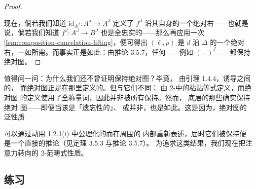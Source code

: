 \begin{proof}
\begin{center}
\end{center}
现在，倘若我们知道 $\mathrm{id}_{A^{J}}\colon A^{J}\to A^{J}$ 定义了
$f^{J}$ 沿其自身的一个绝对右\trLifting——也就是说，倘若我们知道
$f^{J}\colon A^{J}\to B^{J}$ 也是全忠实的——那么再应用一次%
\cref{lem:composition-cancelation-lifting}，便可得出 $(\ell,\rho)$ 是 $d$
沿 $\Delta$ 的一个绝对右\trLifting，一如所需。而事实正是如此：由推论
3.5.7，任何\trCosmologicalFunctor{}——例如 $(-)^{J}$——都保持绝对\trLifting{}图。
\end{proof}

值得问一问：为什么我们还不曾证明\trCosmologicalFunctor{}保持绝对\trLifting{}图？毕竟，
由引理 1.4.4，\trCosmologicalFunctor{}诱导\trHomotopyTwoCategory{}之间的\trTwoFunctor，
而绝对\trLifting{}图正是在那里定义的。但\trAdjunction{}与它们不同：
\trAdjunction{}由 2-\trCategory{}中的粘贴等式定义，而绝对\trLifting{}图
的定义使用了全称量词，因此并非被所有\trTwoFunctor{}保持。然而，
\trCosmologicalFunctor{}底层的那些\trTwoFunctor{}确实保持绝对%
\trLifting{}图——即便当该\trCosmologicalFunctor{}是「遗忘性的」、
或并非\trEssentiallySurjective{}，也是如此。这是因为，绝对\trLifting{}图的
泛性质

可以通过动用 1.2.1(i) 中公理化的\trLimit{}而在周围\trInfinityCosmos{}的
内部重新表述，届时它们被\trCosmologicalFunctor{}保持便是一个直接的推论（见定理 3.5.3
与推论 3.5.7）。
为追求这类结果，我们现在把注意力转向\trCosmologicalLimitNotions{}的 2-范畴式性质。

\subsection*{练习}

